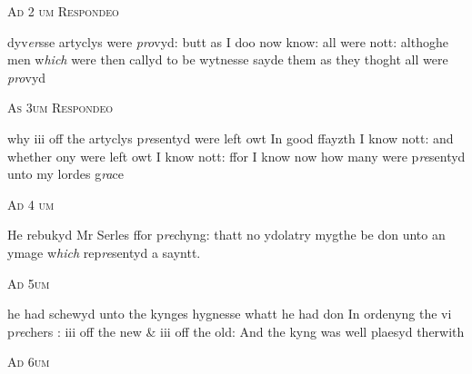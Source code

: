 \documentclass[12pt, a4paper]{book}
\begin{document}
				\begin{center} \begin{large} {\scshape Ad 2 um Respondeo} \end{large} \end{center}
			

		\ifthenelse{\isodd{\thepage}}
		{\reversemarginpar}
		{\normalmarginpar}
		dyv\textit{er}sse artyclys were \textit{pro}vyd: butt as I doo now know: all were
nott: althoghe men w\textit{hich} were then callyd to be wytnesse sayde
them as they thoght all were \textit{pro}vyd

				\begin{center} \begin{large} {\scshape As 3um Respondeo} \end{large} \end{center}
			

		\ifthenelse{\isodd{\thepage}}
		{\reversemarginpar}
		{\normalmarginpar}
		why iii off 
			the artyclys p\textit{re}sentyd were left owt In good ffayzth I 
know nott: and whether ony were left owt I know
nott: ffor I know now how many were p\textit{re}sentyd unto
my lordes g\textit{ra}ce

				\begin{center} \begin{large} {\scshape Ad 4 um } \end{large} \end{center}
			

		\ifthenelse{\isodd{\thepage}}
		{\reversemarginpar}
		{\normalmarginpar}
		He rebukyd Mr Serles ffor p\textit{re}chyng: thatt no ydolatry mygthe be don unto
an ymage w\textit{hich} rep\textit{re}sentyd a sayntt.

				\begin{center} \begin{large} {\scshape Ad 5um} \end{large} \end{center}
			

		\ifthenelse{\isodd{\thepage}}
		{\reversemarginpar}
		{\normalmarginpar}
		he had schewyd unto the kynges hygnesse whatt he had don In ordenyng
the vi p\textit{re}chers : iii off the new \& iii off the old: And the kyng was
well plaesyd therwith

				\begin{center} \begin{large} {\scshape Ad 6um} \end{large} \end{center}
			
\end{document}
